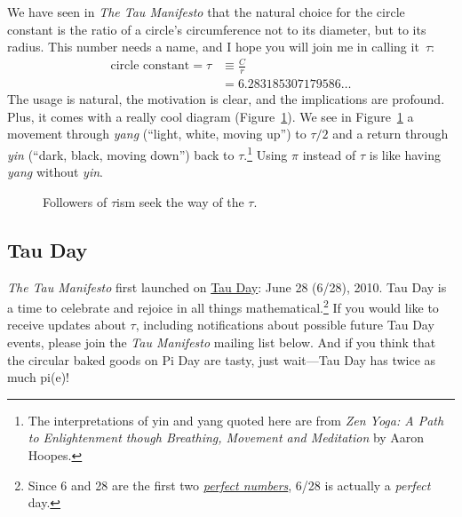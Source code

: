 We have seen in \emph{The Tau Manifesto} that the natural choice for the circle constant is the ratio of a circle's circumference not to its diameter, but to its radius. This number needs a name, and I hope you will join me in calling it~$\tau$:
\[
\begin{split}
\mbox{circle constant} = \tau & \equiv \frac{C}{r} \\
                              & = 6.283185307179586\ldots
\end{split}
\]
The usage is natural, the motivation is clear, and the implications are profound. Plus, it comes with a really cool diagram (Figure~\ref{fig:tauism}). We see in Figure~\ref{fig:tauism} a movement through \emph{yang} (``light, white, moving up'') to $\tau/2$ and a return through \emph{yin} (``dark, black, moving down'') back to $\tau$.\footnote{The interpretations of yin and yang quoted here are from \emph{Zen Yoga: A Path to Enlightenment though Breathing, Movement and Meditation} by Aaron Hoopes.} Using $\pi$ instead of $\tau$ is like having \emph{yang} without \emph{yin}.

\begin{figure}
\begin{center}
\end{center}
\caption{Followers of $\tau$ism seek the way of the $\tau$.\label{fig:tauism}}
\end{figure}



  \subsection{Tau Day} %
  \label{sec:tau_day}

\emph{The Tau Manifesto} first launched on \href{https://tauday.com/}{Tau Day}: June 28 (6/28), 2010. Tau Day is a time to celebrate and rejoice in all things mathematical.\footnote{Since 6 and 28 are the first two \href{https://en.wikipedia.org/wiki/Perfect_number}{\emph{perfect numbers}}, 6/28 is actually a \emph{perfect} day.} If you would like to receive updates about $\tau$, including notifications about possible future Tau Day events, please join the \emph{Tau Manifesto} mailing list below. And if you think that the circular baked goods on Pi Day are tasty, just wait---Tau Day has twice as much pi(e)!

